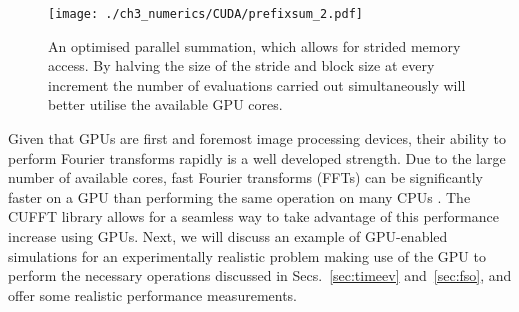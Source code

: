 \begin{figure}
    \centering
    \texttt{[image: ./ch3\_numerics/CUDA/prefixsum\_2.pdf]}
    \caption{An optimised parallel summation, which allows for strided memory access. By halving the size of the stride and block size at every increment the number of evaluations carried out simultaneously will better utilise the available GPU cores.}
    \label{fig:prefixsum2}
\end{figure}

Given that GPUs are first and foremost image processing devices, their ability to perform Fourier transforms rapidly is a well developed strength. Due to the large number of available cores, fast Fourier transforms (FFTs) can be significantly faster on a GPU than performing the same operation on many CPUs \cite{AO:Morgan_pra_2013}. The CUFFT library allows for a seamless way to take advantage of this performance increase using GPUs. Next, we will discuss an example of GPU-enabled simulations for an experimentally realistic problem making use of the GPU to perform the necessary operations discussed in Secs.~\ref{sec:timeev} and~\ref{sec:fso}, and offer some realistic performance measurements.

